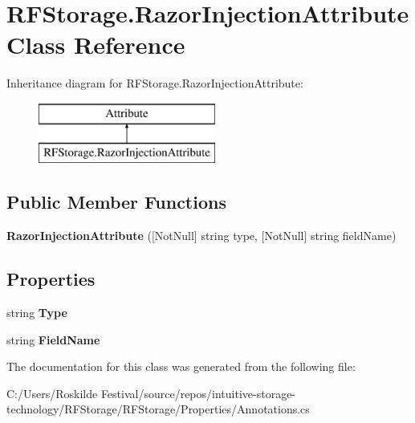 \hypertarget{class_r_f_storage_1_1_razor_injection_attribute}{}\section{R\+F\+Storage.\+Razor\+Injection\+Attribute Class Reference}
\label{class_r_f_storage_1_1_razor_injection_attribute}
Inheritance diagram for R\+F\+Storage.\+Razor\+Injection\+Attribute\+:\begin{figure}[H]
\begin{center}
\leavevmode
\includegraphics[height=2.000000cm]{class_r_f_storage_1_1_razor_injection_attribute}
\end{center}
\end{figure}
\subsection*{Public Member Functions}
\begin{DoxyCompactItemize}
\item 
\mbox{\label{class_r_f_storage_1_1_razor_injection_attribute_aee2b8e12900faafdace6b338bee2b48f}} 
{\bfseries Razor\+Injection\+Attribute} (\mbox{[}Not\+Null\mbox{]} string type, \mbox{[}Not\+Null\mbox{]} string field\+Name)
\end{DoxyCompactItemize}
\subsection*{Properties}
\begin{DoxyCompactItemize}
\item 
\mbox{\label{class_r_f_storage_1_1_razor_injection_attribute_a67e71204c75aa7a01376ee3d1e2ae7bd}} 
string {\bfseries Type}
\item 
\mbox{\label{class_r_f_storage_1_1_razor_injection_attribute_ae75f580869b944beceb7390a416f32d1}} 
string {\bfseries Field\+Name}
\end{DoxyCompactItemize}


The documentation for this class was generated from the following file\+:\begin{DoxyCompactItemize}
\item 
C\+:/\+Users/\+Roskilde Festival/source/repos/intuitive-\/storage-\/technology/\+R\+F\+Storage/\+R\+F\+Storage/\+Properties/Annotations.\+cs\end{DoxyCompactItemize}
